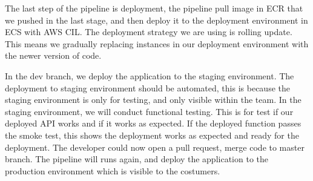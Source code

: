 \par
\label{deploy}
The last step of the pipeline is deployment, the pipeline pull image in ECR that we pushed in the last stage, and then deploy it to the deployment environment in ECS with AWS CIL. The deployment strategy we are using is rolling update. This means we gradually replacing instances in our deployment environment with the newer version of code.
\par
In the dev branch, we deploy the application to the staging environment. The deployment to staging environment should be automated, this is because the staging environment is only for testing, and only visible within the team. 
In the staging environment, we will conduct functional testing. This is for test if our deployed API works and if it works as expected. If the deployed function passes the smoke test, this shows the deployment works as expected and ready for the deployment. The developer could now open a pull request, merge code to master branch. The pipeline will runs again, and deploy the application to the production environment which is visible to the costumers.


